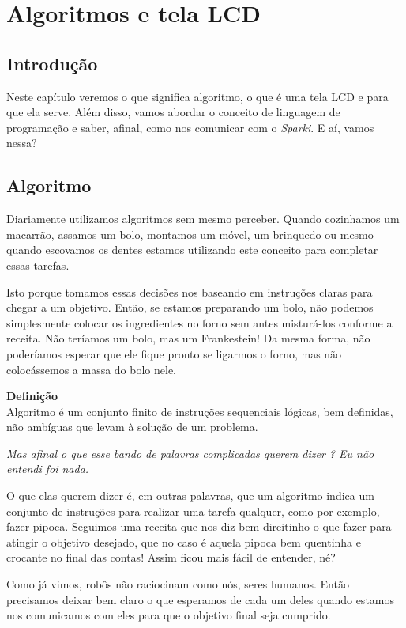 \chapter{Algoritmos e tela LCD}
\section*{Introdução}
    Neste capítulo veremos o que significa algoritmo, o que é uma tela LCD e para que ela serve. Além disso, vamos abordar o conceito de linguagem de programação e saber, afinal, como nos comunicar com o \textit{Sparki}. E aí, vamos nessa?
\section{Algoritmo}
    Diariamente utilizamos algoritmos sem mesmo perceber. Quando cozinhamos um macarrão, assamos um bolo, montamos um móvel, um brinquedo ou mesmo quando escovamos os dentes estamos utilizando este conceito para completar essas tarefas. \par
    Isto porque tomamos essas decisões nos baseando em instruções claras para chegar a um objetivo. Então, se estamos preparando um bolo, não podemos simplesmente colocar os ingredientes no forno sem antes misturá-los conforme a receita. Não teríamos um bolo, mas um Frankestein! Da mesma forma, não poderíamos esperar que ele fique pronto se ligarmos o forno, mas não colocássemos a massa do bolo nele. \par
    \begin{center}
    \textbf{Definição} \\
    Algoritmo é um conjunto finito de instruções sequenciais lógicas, bem definidas, não ambíguas que levam à solução de um problema.
    \end{center}
    \textit{Mas afinal o que esse bando de palavras complicadas querem dizer ? Eu não entendi foi nada.}
    
    O que elas querem dizer é, em outras palavras, que um algoritmo indica um conjunto de instruções para realizar uma tarefa qualquer, como por exemplo, fazer pipoca. Seguimos uma receita que nos diz bem direitinho o que fazer para atingir o objetivo desejado, que no caso é aquela pipoca bem quentinha e crocante no final das contas! Assim ficou mais fácil de entender, né? \par
    Como já vimos, robôs não raciocinam como nós, seres humanos. Então precisamos deixar bem claro o que esperamos de cada um deles quando estamos nos comunicamos com eles para que o objetivo final seja cumprido. 
    
